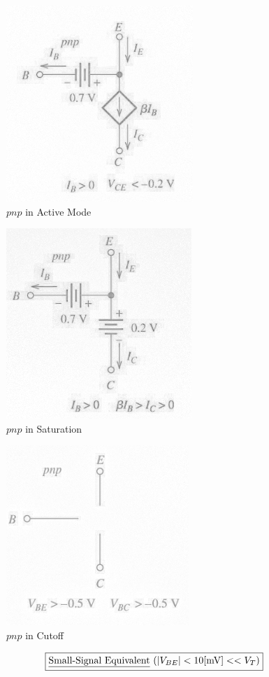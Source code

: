 \documentclass[12pt]{article}
\begin{document}
  \begin{multicols}{3}

    \begin{figure}[H]
      \centering
      \includegraphics[width=.3\textwidth]{Figures/pnpActive}
      \vspace{-10pt}
      \caption{$pnp$ in Active Mode}
      \label{fig:4}
    \end{figure}

    \begin{figure}[H]
      \centering
      \includegraphics[width=.3\textwidth]{Figures/pnpSat}
      \caption{$pnp$ in Saturation}
      \label{fig:5}
    \end{figure}

    \begin{figure}[H]
      \centering
      \includegraphics[width=.3\textwidth]{Figures/pnpCut}
      \caption{$pnp$ in Cutoff}
      \label{fig:6}
    \end{figure}

  \end{multicols}

  \begin{center}
    $$\boxed{\text{\underline{Small-Signal Equivalent} }(|V_{BE}|<10[\si{\milli\volt}]<<V_T)}$$
  \end{center}
\end{document}
